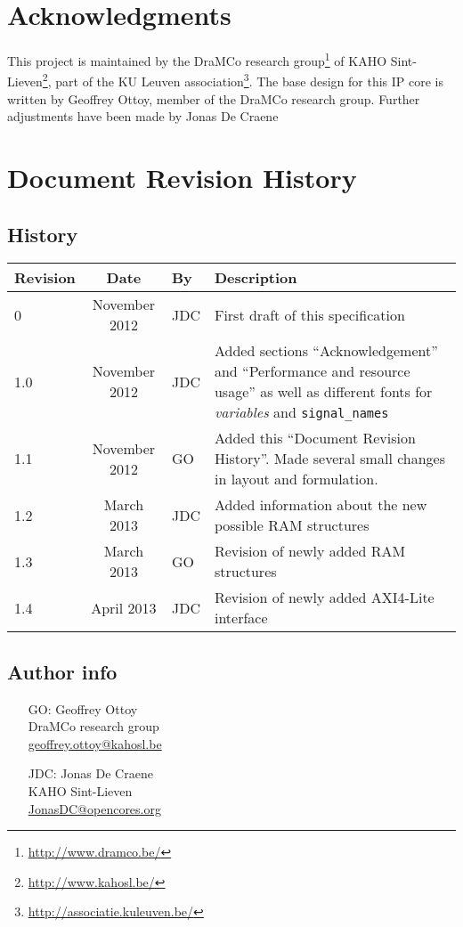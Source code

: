 \chapter*{Acknowledgments}
This project is maintained by the DraMCo research group\footnote{\url{http://www.dramco.be/}} of KAHO Sint-Lieven\footnote{\url{http://www.kahosl.be/}}, part of the KU Leuven association\footnote{\url{http://associatie.kuleuven.be/}}.
The base design for this IP core is written by Geoffrey Ottoy, member of the DraMCo research group. Further adjustments have been made by Jonas De Craene


\chapter*{Document Revision History} 

\section*{History}
\begin{tabular}{|l|c|l|p{10cm}|}
	\hline
	\rowcolor{Gray}
	\textbf{Revision} & \textbf{Date} & \textbf{By} & \textbf{Description} \\
	\hline
	0	& November 2012	& JDC	& First draft of this specification\\
	\hline
	1.0 & November 2012	& JDC	& Added sections ``Acknowledgement'' and ``Performance and resource usage'' as well as different fonts for \textit{variables} and \verb|signal_names|\\
	\hline
	1.1 & November 2012	& GO	& Added this ``Document Revision History''. Made several small changes in layout and formulation.\\
	\hline
	1.2 & March 2013	& JDC	& Added information about the new possible RAM structures\\
	\hline
	1.3 & March 2013	& GO	& Revision of newly added RAM structures\\
	\hline
	1.4	& April 2013	& JDC	& Revision of newly added AXI4-Lite interface\\
	\hline
\end{tabular}%

\section*{Author info}

\begin{itemize}
\item[GO:] Geoffrey Ottoy\\DraMCo research group\\\url{geoffrey.ottoy@kahosl.be}
\item[JDC:] Jonas De Craene\\KAHO Sint-Lieven\\\url{JonasDC@opencores.org}
\end{itemize}